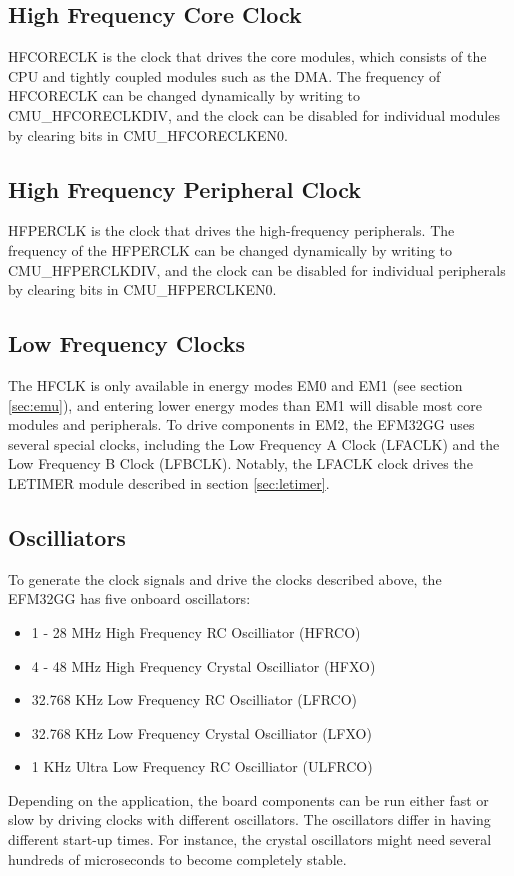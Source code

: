 \subsection{High Frequency Core Clock}
HFCORECLK is the clock that drives the core modules, which consists of the CPU and tightly coupled modules such as the DMA. The frequency of HFCORECLK can be changed dynamically by writing to CMU\_HFCORECLKDIV, and the clock can be disabled for individual modules by clearing bits in CMU\_HFCORECLKEN0. 

\subsection{High Frequency Peripheral Clock}
HFPERCLK is the clock that drives the high-frequency peripherals. The frequency of the HFPERCLK can be changed dynamically by writing to CMU\_HFPERCLKDIV, and the clock can be disabled for individual peripherals by clearing bits in CMU\_HFPERCLKEN0. 

\subsection{Low Frequency Clocks}
The HFCLK is only available in energy modes EM0 and EM1 (see section \ref{sec:emu}), and entering lower energy modes than EM1 will disable most core modules and peripherals. To drive components in EM2, the EFM32GG uses several special clocks, including the Low Frequency A Clock (LFACLK) and the Low Frequency B Clock (LFBCLK). Notably, the LFACLK clock drives the LETIMER module described in section \ref{sec:letimer}.

\subsection{Oscilliators}
To generate the clock signals and drive the clocks described above, the EFM32GG has five onboard oscillators:
\begin{itemize}
  \item 1 - 28 MHz High Frequency RC Oscilliator (HFRCO)
  \item 4 - 48 MHz High Frequency Crystal Oscilliator (HFXO)
  \item 32.768 KHz Low Frequency RC Oscilliator (LFRCO)
  \item 32.768 KHz Low Frequency Crystal Oscilliator (LFXO)
  \item 1 KHz Ultra Low Frequency RC Oscilliator (ULFRCO)
\end{itemize}
Depending on the application, the board components can be run either fast or slow by driving clocks with different oscillators. The oscillators differ in having different start-up times. For instance, the crystal oscillators might need several hundreds of microseconds to become completely stable.\cite{efm32-clock-management-unit-application-note}


